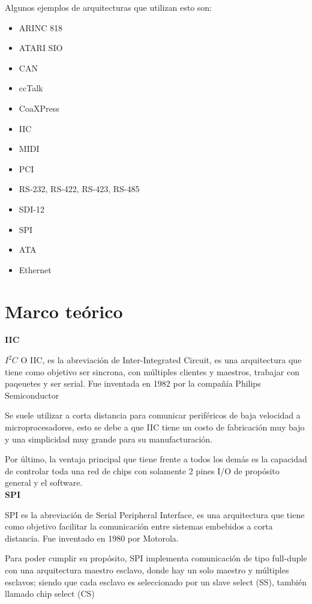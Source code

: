 \documentclass[conference]{IEEEtran}
\begin{document}
\par Algunos ejemplos de arquitecturas que utilizan esto son:
\begin{itemize}
    \item ARINC 818
    \item ATARI SIO
    \item CAN
    \item ccTalk
    \item CoaXPress
    \item IIC
    \item MIDI
    \item PCI
    \item RS-232, RS-422, RS-423, RS-485
    \item SDI-12
    \item SPI
    \item ATA
    \item Ethernet 
    
\end{itemize}

\section{Marco teórico}
\textbf{IIC}\\
\par $I^2C$ O IIC, es la abreviación de Inter-Integrated Circuit, es una arquitectura que tiene como objetivo ser sincrona, con múltiples clientes y maestros, trabajar con paqeuetes y ser serial. Fue inventada en 1982 por la compañía Philips Semiconductor\\
\par Se suele utilizar a corta distancia para comunicar periféricos de baja velocidad a microprocesadores, esto se debe a que IIC tiene un costo de fabricación muy bajo y una simplicidad muy grande para su manufacturación.\\
\par Por último, la ventaja principal que tiene frente a todos los demás es la capacidad de controlar toda una red de chips con solamente 2 pines I/O de propósito general y el software.\\

\textbf{SPI}\\
\par SPI es la abreviación de Serial Peripheral Interface, es una arquitectura que tiene como objetivo facilitar la comunicación entre sistemas embebidos a corta distancia. Fue inventado en 1980 por Motorola.\\
\par Para poder cumplir su propósito, SPI implementa comunicación de tipo full-duple con una arquitectura maestro esclavo, donde hay un solo maestro y múltiples esclavos; siendo que cada esclavo es seleccionado por un slave select (SS), también llamado chip select (CS)\\
\end{document}
